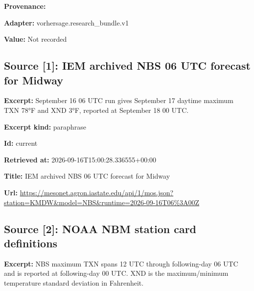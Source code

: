 \documentclass[11pt]{article}
\begin{document}
\par\noindent\textbf{Provenance:} \par \par\noindent\textbf{Adapter:} vorhersage.r\hspace{0pt}esearch\_bund\hspace{0pt}le.v1

\par\noindent\textbf{Value:} Not recorded

\subsection*{\textcolor{epdarkgreen}{Source [1]: IEM archived NBS 06 UTC forecast for Midway}}
\par\noindent\textbf{Excerpt:} September 16 06 UTC run gives September 17 daytime maximum TXN 78°F and XND 3°F, reported at September 18 00 UTC.

\par\noindent\textbf{Excerpt kind:} paraphrase

\par\noindent\textbf{Id:} current

\par\noindent\textbf{Retrieved at:} 2026-09-16T1\hspace{0pt}5:00:28.3365\hspace{0pt}55+00:00

\par\noindent\textbf{Title:} IEM archived NBS 06 UTC forecast for Midway

\par\noindent\textbf{Url:} \href{https://mesonet.agron.iastate.edu/api/1/mos.json?station=KMDW\&model=NBS\&runtime=2026-09-16T06\%3A00Z}{https://meso\hspace{0pt}net.agron.ia\hspace{0pt}state.edu/ap\hspace{0pt}i/1/mos.json\hspace{0pt}?station=KMD\hspace{0pt}W\&model=NBS\&\hspace{0pt}runtime=2026\hspace{0pt}-09-16T06\%3A\hspace{0pt}00Z}

\subsection*{\textcolor{epdarkgreen}{Source [2]: NOAA NBM station card definitions}}
\par\noindent\textbf{Excerpt:} NBS maximum TXN spans 12 UTC through following-day 06 UTC and is reported at following-day 00 UTC. XND is the maximum/minimum temperature standard deviation in Fahrenheit.
\end{document}
